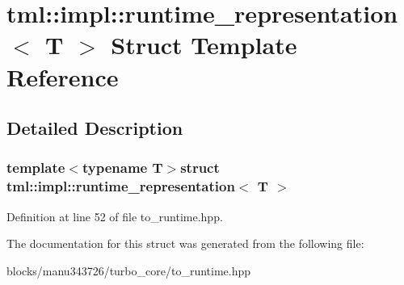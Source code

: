 \hypertarget{structtml_1_1impl_1_1runtime__representation}{\section{tml\+:\+:impl\+:\+:runtime\+\_\+representation$<$ T $>$ Struct Template Reference}
\label{structtml_1_1impl_1_1runtime__representation}
}


\subsection{Detailed Description}
\subsubsection*{template$<$typename T$>$struct tml\+::impl\+::runtime\+\_\+representation$<$ T $>$}



Definition at line 52 of file to\+\_\+runtime.\+hpp.



The documentation for this struct was generated from the following file\+:\begin{DoxyCompactItemize}
\item 
blocks/manu343726/turbo\+\_\+core/to\+\_\+runtime.\+hpp\end{DoxyCompactItemize}
